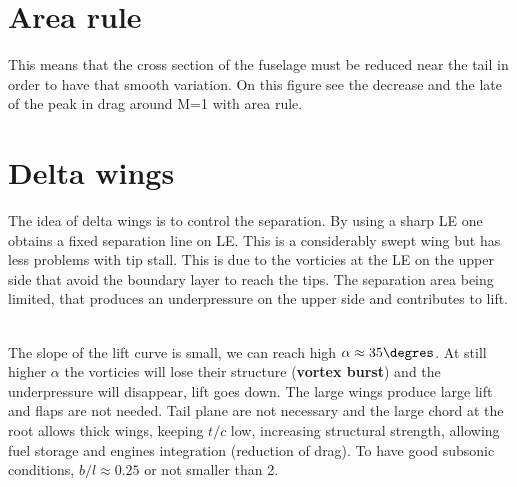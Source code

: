 \section{Area rule}
	\begin{center}
	\end{center}
	
	\begin{center}
	\end{center}
	
	
	This means that the cross section of the fuselage must be reduced near the tail in order to have that smooth variation. On this figure see the decrease and the late of the peak in drag around M=1 with area rule. 
	
	\newpage
\section{Delta wings}
	The idea of delta wings is to control the separation. By using a sharp LE one obtains a fixed separation line on LE. This is a considerably swept wing but has less problems with tip stall. This is due to the vorticies at the LE on the upper side that avoid the boundary layer to reach the tips. The separation area being limited, that produces an underpressure on the upper side and contributes to lift. 
	
	\ \\
	The slope of the lift curve is small, we can reach high $\alpha \approx 35\degres$. At still higher $\alpha$ the vorticies will lose their structure (\textbf{vortex burst}) and the underpressure will disappear, lift goes down. The large wings produce large lift and flaps are not needed. Tail plane are not necessary and the large chord at the root allows thick wings, keeping $t/c$ low, increasing structural strength, allowing fuel storage and engines integration (reduction of drag). To have good subsonic conditions, $b/l \approx 0.25$ or not smaller than 2.
	
